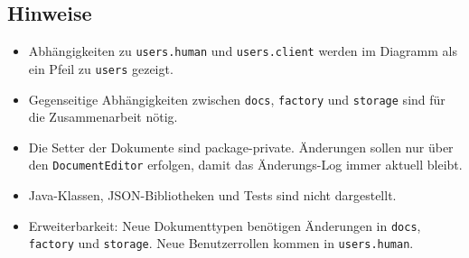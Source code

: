 \subsection{Hinweise}
\begin{itemize}
    \item Abhängigkeiten zu \texttt{users.human} und \texttt{users.client} werden im Diagramm als ein Pfeil zu \texttt{users} gezeigt.
    \item Gegenseitige Abhängigkeiten zwischen \texttt{docs}, \texttt{factory} und \texttt{storage} sind für die Zusammenarbeit nötig.
    \item Die Setter der Dokumente sind package-private. Änderungen sollen nur über den \texttt{DocumentEditor} erfolgen, damit das Änderungs-Log immer aktuell bleibt.
    \item Java-Klassen, JSON-Bibliotheken und Tests sind nicht dargestellt.
    \item Erweiterbarkeit: Neue Dokumenttypen benötigen Änderungen in \texttt{docs}, \texttt{factory} und \texttt{storage}. Neue Benutzerrollen kommen in \texttt{users.human}.
\end{itemize}